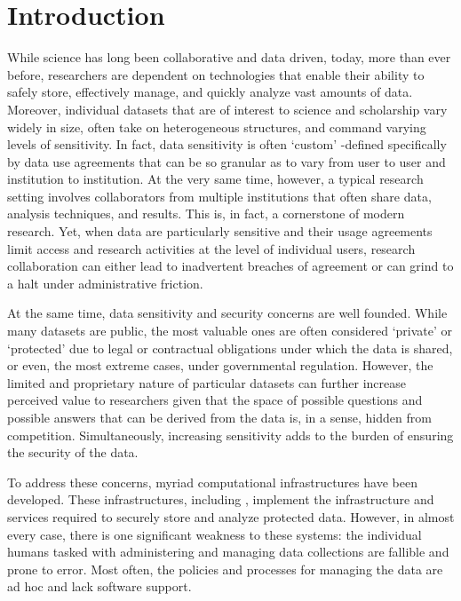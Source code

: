 \section{Introduction}



While science has long been collaborative and data driven, today, more than ever before,
researchers are dependent on technologies that enable their ability to safely store,
effectively manage, and quickly analyze vast amounts of
data. Moreover, individual datasets that are of interest to science and scholarship
vary widely in size, often take on heterogeneous structures, and command varying
levels of sensitivity. In fact, data sensitivity is often `custom' -defined specifically by
data use agreements that can be so granular as to vary from user to user and institution
to institution. At the very same time, however, a typical research setting involves
collaborators from multiple institutions that often share data, analysis techniques,
and results. This is, in fact, a cornerstone of modern research. Yet, when data are
particularly sensitive and their usage agreements limit access and research activities at the
level of individual users, research collaboration can either lead to inadvertent
breaches of agreement or can grind to a halt under administrative friction.


At the same time, data sensitivity and security concerns are well founded. While many datasets are public, the most
valuable ones are often considered `private' or `protected' due to legal or contractual obligations under which the data
is shared, or even, the most extreme cases, under governmental regulation. However, the limited and proprietary nature
of particular datasets can further increase perceived value to researchers given that the space of possible
questions and possible answers that can be derived from the data is, in a sense, hidden from competition.
Simultaneously, increasing sensitivity adds to the burden of ensuring the security of the data.


To address these concerns, myriad computational infrastructures
have been developed. These infrastructures, including \NAMENS \cite{babuji2016cloud},
implement the infrastructure and services required to securely store and analyze protected
data. However, in almost every case, there is one significant weakness to these systems: the individual humans tasked with administering and managing
data collections are fallible and prone to error. Most often, the policies and processes for managing
the data are ad hoc and lack software support.

